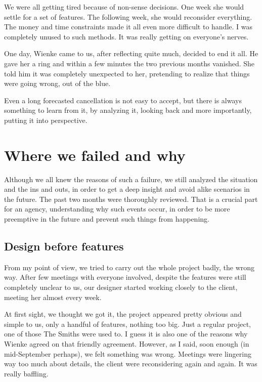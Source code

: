 \medskip

We were all getting tired because of non-sense decisions. One week she would settle for a set of features. The following week, she would reconsider everything. The money and time constraints made it all even more difficult to handle. I was completely unused to such methods. It was really getting on everyone's nerves.

\medskip

One day, Wienke came to us, after reflecting quite much, decided to end it all. He gave her a ring and within a few minutes the two previous months vanished. She told him it was completely unexpected to her, pretending to realize that things were going wrong, out of the blue.

\medskip

Even a long forecasted cancellation is not easy to accept, but there is always something to learn from it, by analyzing it, looking back and more importantly, putting it into perspective.

\section{Where we failed and why}

Although we all knew the reasons of such a failure, we still analyzed the situation and the ins and outs, in order to get a deep insight and avoid alike scenarios in the future. The past two months were thoroughly reviewed. That is a crucial part for an agency, understanding why such events occur, in order to be more preemptive in the future and prevent such things from happening.

\subsection{Design before features}

From my point of view, we tried to carry out the whole project badly, the wrong way. After few meetings with everyone involved, despite the features were still completely unclear to us, our designer started working closely to the client, meeting her almost every week.

\medskip

At first sight, we thought we got it, the project appeared pretty obvious and simple to us, only a handful of features, nothing too big. Just a regular project, one of those The Smiths were used to. I guess it is also one of the reasons why Wienke agreed on that friendly agreement. However, as I said, soon enough (in mid-September perhaps), we felt something was wrong. Meetings were lingering way too much about details, the client were reconsidering again and again. It was really baffling.

